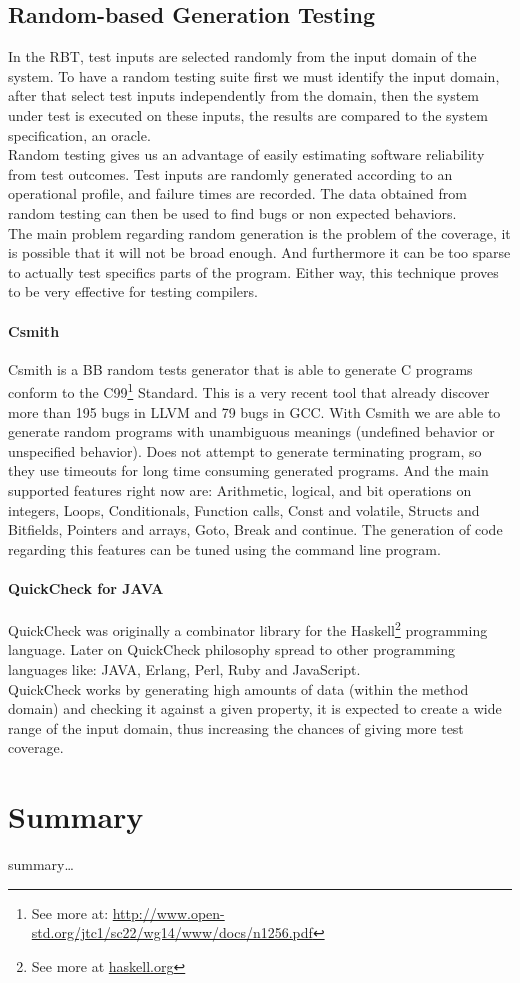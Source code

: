 \subsection{Random-based Generation Testing}
In the \ac{RBT}, test inputs are selected randomly from the input domain of the system.
To have a random testing suite first we must identify the input domain, after that select test inputs independently from the domain,
then the system under test is executed on these inputs, the results are compared to the system specification, an oracle.\\
Random testing gives us an advantage of easily estimating software reliability from test outcomes.
Test inputs are randomly generated according to an operational profile, and failure times are recorded.
The data obtained from random testing can then be used to find bugs or non expected behaviors.\\
\indent The main problem regarding random generation is the problem of the coverage, it is possible that it will not be broad enough. And furthermore it can be
too sparse to actually test specifics parts of the program. Either way, this technique proves to be very effective for testing compilers.

\paragraph{Csmith}
Csmith\cite{Yang:2011:FUB:1993316.1993532} is a \ac{BB} random tests generator that is able to generate C programs
conform to the C99\footnote{See more at: \url{http://www.open-std.org/jtc1/sc22/wg14/www/docs/n1256.pdf}} Standard. This is a very recent tool that already discover
more than 195 bugs in \ac{LLVM} and 79 bugs in \ac{GCC}. With Csmith we are able to generate random programs with unambiguous meanings (undefined behavior or 
unspecified behavior). Does not attempt to generate terminating program, so they use timeouts for long time consuming generated programs.
And the main supported features right now are: Arithmetic, logical, and bit operations on integers, Loops, Conditionals, Function calls, Const and volatile,
Structs and Bitfields, Pointers and arrays, Goto, Break and continue. The generation of code regarding this features can be tuned using the command line program.

\paragraph{QuickCheck for JAVA}
QuickCheck was originally a combinator library for the Haskell\footnote{See more at \url{haskell.org}} programming language\cite{Claessen:2000:QLT:357766.351266}.
Later on QuickCheck philosophy spread to other programming languages like: JAVA, Erlang, Perl, Ruby and JavaScript.\\
QuickCheck works by generating high amounts of data (within the method domain) and checking it against a given property,
it is expected to create a wide range of the input domain, thus increasing the chances of giving more test coverage.

\section{Summary}
summary\ldots
\secendnote
